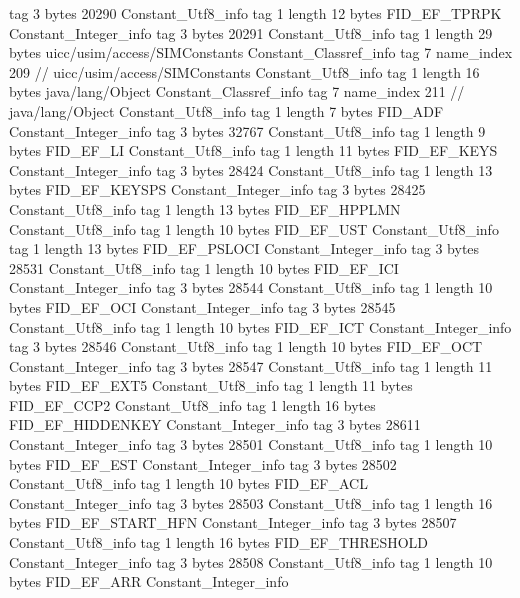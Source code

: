 {{{			tag	3
			bytes	20290
		}
		Constant_Utf8_info {
			tag	1
			length	12
			bytes	FID_EF_TPRPK
		}
		Constant_Integer_info {
			tag	3
			bytes	20291
		}
		Constant_Utf8_info {
			tag	1
			length	29
			bytes	uicc/usim/access/SIMConstants
		}
		Constant_Classref_info {
			tag	7
			name_index	209		// uicc/usim/access/SIMConstants
		}
		Constant_Utf8_info {
			tag	1
			length	16
			bytes	java/lang/Object
		}
		Constant_Classref_info {
			tag	7
			name_index	211		// java/lang/Object
		}
		Constant_Utf8_info {
			tag	1
			length	7
			bytes	FID_ADF
		}
		Constant_Integer_info {
			tag	3
			bytes	32767
		}
		Constant_Utf8_info {
			tag	1
			length	9
			bytes	FID_EF_LI
		}
		Constant_Utf8_info {
			tag	1
			length	11
			bytes	FID_EF_KEYS
		}
		Constant_Integer_info {
			tag	3
			bytes	28424
		}
		Constant_Utf8_info {
			tag	1
			length	13
			bytes	FID_EF_KEYSPS
		}
		Constant_Integer_info {
			tag	3
			bytes	28425
		}
		Constant_Utf8_info {
			tag	1
			length	13
			bytes	FID_EF_HPPLMN
		}
		Constant_Utf8_info {
			tag	1
			length	10
			bytes	FID_EF_UST
		}
		Constant_Utf8_info {
			tag	1
			length	13
			bytes	FID_EF_PSLOCI
		}
		Constant_Integer_info {
			tag	3
			bytes	28531
		}
		Constant_Utf8_info {
			tag	1
			length	10
			bytes	FID_EF_ICI
		}
		Constant_Integer_info {
			tag	3
			bytes	28544
		}
		Constant_Utf8_info {
			tag	1
			length	10
			bytes	FID_EF_OCI
		}
		Constant_Integer_info {
			tag	3
			bytes	28545
		}
		Constant_Utf8_info {
			tag	1
			length	10
			bytes	FID_EF_ICT
		}
		Constant_Integer_info {
			tag	3
			bytes	28546
		}
		Constant_Utf8_info {
			tag	1
			length	10
			bytes	FID_EF_OCT
		}
		Constant_Integer_info {
			tag	3
			bytes	28547
		}
		Constant_Utf8_info {
			tag	1
			length	11
			bytes	FID_EF_EXT5
		}
		Constant_Utf8_info {
			tag	1
			length	11
			bytes	FID_EF_CCP2
		}
		Constant_Utf8_info {
			tag	1
			length	16
			bytes	FID_EF_HIDDENKEY
		}
		Constant_Integer_info {
			tag	3
			bytes	28611
		}
		Constant_Integer_info {
			tag	3
			bytes	28501
		}
		Constant_Utf8_info {
			tag	1
			length	10
			bytes	FID_EF_EST
		}
		Constant_Integer_info {
			tag	3
			bytes	28502
		}
		Constant_Utf8_info {
			tag	1
			length	10
			bytes	FID_EF_ACL
		}
		Constant_Integer_info {
			tag	3
			bytes	28503
		}
		Constant_Utf8_info {
			tag	1
			length	16
			bytes	FID_EF_START_HFN
		}
		Constant_Integer_info {
			tag	3
			bytes	28507
		}
		Constant_Utf8_info {
			tag	1
			length	16
			bytes	FID_EF_THRESHOLD
		}
		Constant_Integer_info {
			tag	3
			bytes	28508
		}
		Constant_Utf8_info {
			tag	1
			length	10
			bytes	FID_EF_ARR
		}
		Constant_Integer_info {
}}}
